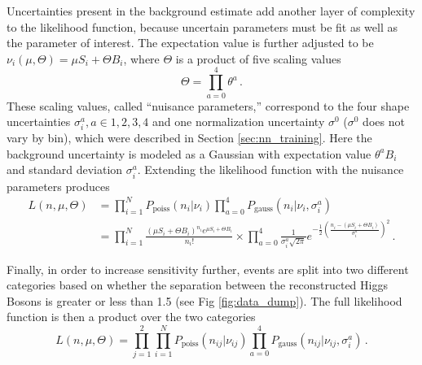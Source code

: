     Uncertainties present in the background estimate add another layer of complexity to the likelihood function,
        because uncertain parameters must be fit as well as the parameter of interest.
    The expectation value is further adjusted to be $\nu_i(\mu, \Theta) = \mu S_i + \Theta B_i$,
        where $\Theta$ is a product of five scaling values 
    \begin{equation}
        \Theta = \prod \limits_{a=0}^{4}  \theta^a
        \,.
    \end{equation}
    These scaling values, called ``nuisance parameters,''
        correspond to the four \mhh shape uncertainties $\sigma_i^a, a\in{1,2,3,4}$
        and one normalization uncertainty $\sigma^0$ ($\sigma^0$ does not vary by bin),
        which were described in Section \ref{sec:nn_training}.
    Here the background uncertainty is modeled as a Gaussian with expectation value $\theta^a B_i$ and standard deviation $\sigma_i^a$.
    Extending the likelihood function with the nuisance parameters produces
    \begin{equation} \begin{split}
        L(n,\mu,\Theta) &= \prod \limits_{i=1}^{N} P_{\textrm{poiss}}(n_i | \nu_i) 
             \prod \limits_{a=0}^{4} P_{\textrm{gauss}}(n_i | \nu_i, \sigma_i^a) 
        \\&= \prod \limits_{i=1}^{N} \frac{ (\mu S_i + \Theta B_i)^{n_i} e^{\mu S_i + \Theta B_i} }{n_i!} \times
            \prod \limits_{a=0}^4 \frac{1}{\sigma_i^a \sqrt{2\pi}} e^{
                -\frac{1}{2}\left(\frac{n_i- (\mu S_i + \Theta B_i)}{\sigma_i^a}\right)^2
            }
        \,.
    \end{split} \end{equation}

    Finally, in order to increase sensitivity further, events are split into two different categories
        based on whether the \deta separation between the reconstructed Higgs Bosons is greater or less than 1.5 (see Fig \ref{fig:data_dump}).
    The full likelihood function is then a product over the two categories
    \begin{equation}
        L(n,\mu,\Theta) = \prod \limits_{j=1}^{2}
             \prod \limits_{i=1}^{N} P_{\textrm{poiss}}(n_{ij} | \nu_{ij}) 
             \prod \limits_{a=0}^{4} P_{\textrm{gauss}}(n_{ij} | \nu_{ij}, \sigma_{i}^a) 
        \,.
    \end{equation}

